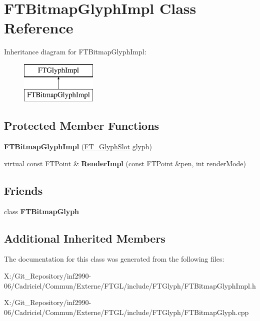 \hypertarget{class_f_t_bitmap_glyph_impl}{\section{F\-T\-Bitmap\-Glyph\-Impl Class Reference}
\label{class_f_t_bitmap_glyph_impl}
}
Inheritance diagram for F\-T\-Bitmap\-Glyph\-Impl\-:\begin{figure}[H]
\begin{center}
\leavevmode
\includegraphics[height=2.000000cm]{class_f_t_bitmap_glyph_impl}
\end{center}
\end{figure}
\subsection*{Protected Member Functions}
\begin{DoxyCompactItemize}
\item 
\hypertarget{class_f_t_bitmap_glyph_impl_a4462585cd1fc2e461ff8c6a0b49c68b3}{{\bfseries F\-T\-Bitmap\-Glyph\-Impl} (\hyperlink{struct_f_t___glyph_slot_rec__}{F\-T\-\_\-\-Glyph\-Slot} glyph)}\label{class_f_t_bitmap_glyph_impl_a4462585cd1fc2e461ff8c6a0b49c68b3}

\item 
\hypertarget{class_f_t_bitmap_glyph_impl_a31a412b09a68489ab2e96ad4524badde}{virtual const F\-T\-Point \& {\bfseries Render\-Impl} (const F\-T\-Point \&pen, int render\-Mode)}\label{class_f_t_bitmap_glyph_impl_a31a412b09a68489ab2e96ad4524badde}

\end{DoxyCompactItemize}
\subsection*{Friends}
\begin{DoxyCompactItemize}
\item 
\hypertarget{class_f_t_bitmap_glyph_impl_aa3f0c28a7cfbfa0e896973476f7ed49d}{class {\bfseries F\-T\-Bitmap\-Glyph}}\label{class_f_t_bitmap_glyph_impl_aa3f0c28a7cfbfa0e896973476f7ed49d}

\end{DoxyCompactItemize}
\subsection*{Additional Inherited Members}


The documentation for this class was generated from the following files\-:\begin{DoxyCompactItemize}
\item 
X\-:/\-Git\-\_\-\-Repository/inf2990-\/06/\-Cadriciel/\-Commun/\-Externe/\-F\-T\-G\-L/include/\-F\-T\-Glyph/F\-T\-Bitmap\-Glyph\-Impl.\-h\item 
X\-:/\-Git\-\_\-\-Repository/inf2990-\/06/\-Cadriciel/\-Commun/\-Externe/\-F\-T\-G\-L/include/\-F\-T\-Glyph/F\-T\-Bitmap\-Glyph.\-cpp\end{DoxyCompactItemize}
